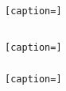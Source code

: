 \section{}
  \subsection{}
    \begin{lstlisting}[caption=]
    \end{lstlisting}

  \subsection{}
    \subsubsection{}
      \begin{lstlisting}[caption=]
      \end{lstlisting}

    \subsubsection{}
      \begin{lstlisting}[caption=]
      \end{lstlisting}
